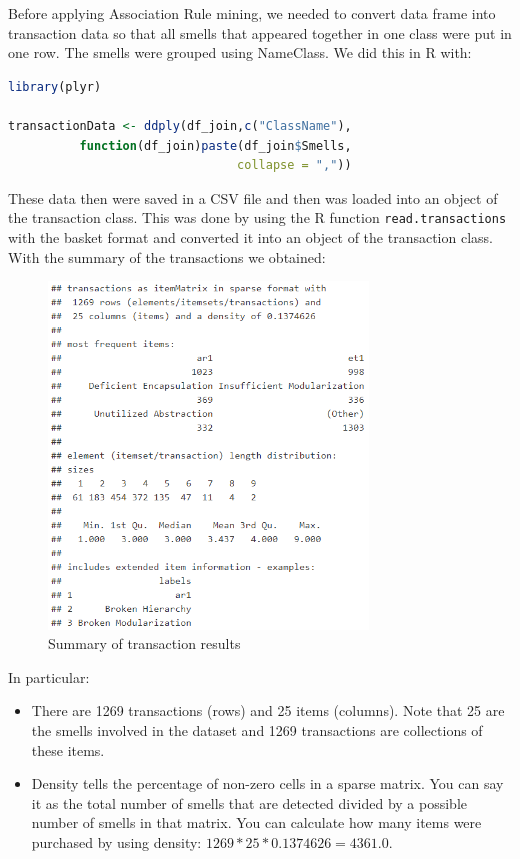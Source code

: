 Before applying Association Rule mining, we needed to convert data frame into transaction data so that all smells that appeared together in one class were put in one row.
The smells were grouped using NameClass. We did this in R with:

\begin{lstlisting}[language=R]
library(plyr)

transactionData <- ddply(df_join,c("ClassName"),
          function(df_join)paste(df_join$Smells,
                                collapse = ","))
\end{lstlisting}

These data then were saved in a CSV file and then was loaded into an object of the transaction class. This was done by using the R function \verb|read.transactions| with the basket format and converted it into an object of the transaction class. 
With the summary of the transactions we obtained:


\begin{figure}[htp]
    \centering
    \includegraphics[width=8.5cm]{img/summaryTransaction.PNG}
    \caption{Summary of transaction results}
    \label{fig:summaryTransaction}
\end{figure}

In particular:
\begin{itemize}
  \item There are 1269 transactions (rows) and 25 items (columns). Note that 25 are the smells involved in the dataset and 1269 transactions are collections of these items.
  \item Density tells the percentage of non-zero cells in a sparse matrix. You can say it as the total number of smells that are detected divided by a possible number of smells in that matrix. You can calculate how many items were purchased by using density: $1269 * 25 * 0.1374626 = 4361.0$.
\end{itemize}

